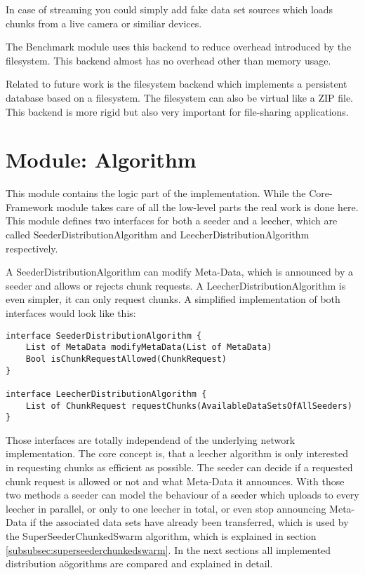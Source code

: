 In case of streaming you could simply add fake data set sources which loads chunks from a live camera or similiar devices.

The Benchmark module uses this backend to reduce overhead introduced by the filesystem. This backend almost has no overhead other than memory usage.

Related to future work is the filesystem backend which implements a persistent database based on a filesystem. The filesystem can also be virtual like a ZIP file. This backend is more rigid but also very important for file-sharing applications.

\cleardoublepage
\section{Module: Algorithm}
\label{sec:algorithm}
This module contains the logic part of the implementation. While the Core-Framework module takes care of all the low-level parts the real work is done here. This module defines two interfaces for both a seeder and a leecher, which are called SeederDistributionAlgorithm and LeecherDistributionAlgorithm respectively. 

A SeederDistributionAlgorithm can modify Meta-Data, which is announced by a seeder and allows or rejects chunk requests. A LeecherDistributionAlgorithm is even simpler, it can only request chunks. A simplified implementation of both interfaces would look like this:

\begin{verbatim}
interface SeederDistributionAlgorithm {
    List of MetaData modifyMetaData(List of MetaData)
    Bool isChunkRequestAllowed(ChunkRequest)
}

interface LeecherDistributionAlgorithm {
    List of ChunkRequest requestChunks(AvailableDataSetsOfAllSeeders)
}
\end{verbatim}

Those interfaces are totally independend of the underlying network implementation. The core concept is, that a leecher algorithm is only interested in requesting chunks as efficient as possible. The seeder can decide if a requested chunk request is allowed or not and what Meta-Data it announces. With those two methods a seeder can model the behaviour of a seeder which uploads to every leecher in parallel, or only to one leecher in total, or even stop announcing Meta-Data if the associated data sets have already been transferred, which is used by the SuperSeederChunkedSwarm algorithm, which is explained in section \ref{subsubsec:superseederchunkedswarm}. In the next sections all implemented distribution aögorithms are compared and explained in detail.


